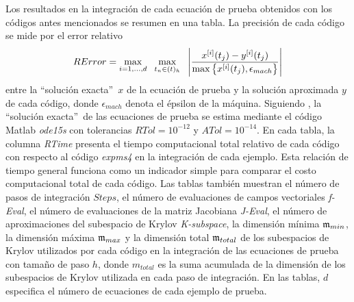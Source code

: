 Los resultados en la integración de cada ecuación de prueba obtenidos con los códigos antes mencionados se resumen en una tabla. La precisión de cada código se mide por el error relativo
\begin{equation}\label{num-exp-lldp-fix-step:ER}
	RError = \max_{i=1,\ldots,d} \;\ \max_{t_n\in(t)_h}  \;\ \left\lvert\frac{x^{[i]}(t_j)-y^{[i]}(t_j)}{\maxx{x^{[i]}(t_j),\epsilon_{mach}}}\right\rvert
\end{equation}
entre la \textquotedblleft solución exacta\textquotedblright~$x$ de la ecuación de prueba y la solución aproximada $y$ de cada código, donde $\epsilon_{mach}$ denota el épsilon de la máquina. Siguiendo \cite{tokman2006efficient}, la \textquotedblleft solución exacta\textquotedblright~de las ecuaciones de prueba se estima mediante el código Matlab \textit{ode15s} con tolerancias $RTol=10^{-12}$ y $ATol=10^{-14}$. En cada tabla, la columna \textit{RTime} presenta el tiempo computacional total relativo de cada código con respecto al código \emph{expms4} en la integración de cada ejemplo. Esta relación de tiempo general funciona como un indicador simple para comparar el costo computacional total de cada código. Las tablas también muestran el número de pasos de integración $Steps$, el número de evaluaciones de campos vectoriales \textit{f-Eval}, el número de evaluaciones de la matriz Jacobiana \textit{J-Eval}, el número de aproximaciones del subespacio de Krylov \textit{K-subspace}, la dimensión mínima $\mathfrak{m}_{min}$, la dimensión máxima $\mathfrak{m}_{max}$ y la dimensión total $\mathfrak{m}_{total}$ de los subespacios de Krylov utilizados por cada código en la integración de las ecuaciones de prueba con tamaño de paso $h$, donde $m_{total}$ es la suma acumulada de la dimensión de los subespacios de Krylov utilizada en cada paso de integración. En las tablas, $d$ especifica el número de ecuaciones de cada ejemplo de prueba.

\vspace{0.5cm}

